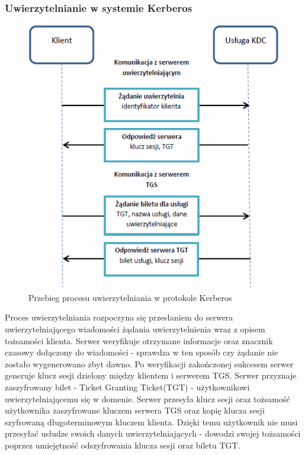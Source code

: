 		\subsubsection{Uwierzytelnianie w systemie Kerberos}

			\begin{figure}[h]
				\centering
					\includegraphics{img/kerberos.png}
				\caption{Przebieg procesu uwierzytelniania w protokole Kerberos}
				\label{Przebieg procesu uwierzytelniania w protokole Kerberos}
			\end{figure}

			Proces uwierzytelniania rozpoczyna się przesłaniem  do serwera uwierzytelniającego wiadomości żądania uwierzytelnienia wraz z opisem tożsamości klienta\cite{Garman03}. Serwer weryfikuje otrzymane informacje oraz znacznik czasowy dołączony do wiadomości - sprawdza w ten sposób czy żądanie nie zostało wygenerowano zbyt dawno. Po weryfikacji zakończonej sukcesem serwer generuje klucz sesji dzielony między klientem i serwerem TGS. Serwer przyznaje zaszyfrowany bilet - Ticket Granting Ticket(TGT) - użytkownikowi uwierzytelniającemu się w domenie. Serwer przesyła klucz sesji oraz tożsamość użytkownika zaszyfrowane kluczem serwera TGS oraz kopię klucza sesji szyfrowaną długoterminowym kluczem klienta. Dzięki temu użytkownik nie musi przesyłać usłudze swoich danych uwierzytelniających - dowodzi swojej tożsamości poprzez umiejętność odszyfrowania klucza sesji oraz biletu TGT. 

